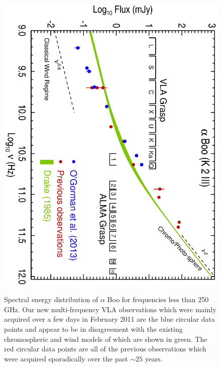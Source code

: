 \documentclass[iop]{emulateapj}
\begin{document}
\begin{figure}
\centering
\includegraphics[trim = 0mm 0mm 0mm 20mm, clip,scale=0.65, angle=90]{fig1.ps}
\\
\caption{Spectral energy distribution of $\alpha$ Boo for frequencies less than 250 GHz. Our new multi-frequency VLA observations which were mainly acquired over a few days in February 2011 are the blue circular data points and appear to be in disagreement with the existing chromospheric and wind models of \cite{1985pssl.proc..351D} which are shown in green. The red circular data points are all of the previous observations which were acquired sporadically over the past $\sim 25$ years.}
\label{fig:fig1}
\centering

\end{figure}
\end{document}
